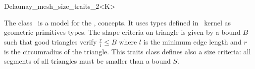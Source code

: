 \begin{ccRefClass}{Delaunay_mesh_size_traits_2<K>}

\ccDefinition
  
The class \ccRefName\ is a model for the ,
concepts. It uses types defined in \cgal\ kernel as geometric
primitives types. The shape criteria on triangle is given by a bound
$B$ such that good triangles verify $\frac{r}{l} \le B$ where $l$ is
the minimum edge length and $r$ is the circumradius of the triangle.
This traits class defines also a size criteria: all segments of all
triangles must be smaller than a bound $S$.


\ccIsModel


\ccCreation
{}

\end{ccRefClass}

